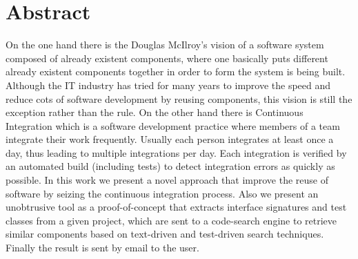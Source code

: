 \chapter{Abstract}
On the one hand there is the Douglas McIlroy's vision \cite{McIlroy1968} of a software system composed of already existent components, where one basically puts different already existent components together in order to form the system is being built. Although the IT industry has tried for many years to improve the speed and reduce cots of software development by reusing components, this vision is still the exception rather than the rule. On the other hand there is Continuous Integration which is a software development practice where members of a team integrate their work frequently. Usually each person integrates at least once a day, thus leading to multiple integrations per day. Each integration is verified by an automated build (including tests) to detect integration errors as quickly as possible. In this work we present a novel approach that improve the reuse of software by seizing the continuous integration process. Also we present an unobtrusive tool as a proof-of-concept that extracts interface signatures and test classes from a given project, which are sent to a code-search engine to retrieve similar components based on text-driven and test-driven search techniques. Finally the result is sent by email to the user.